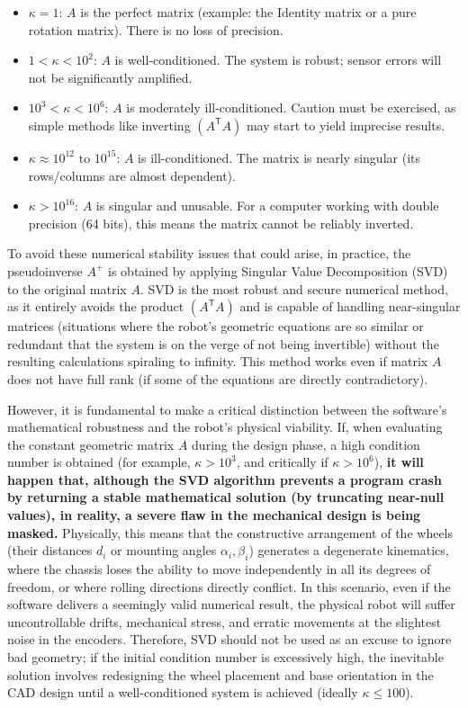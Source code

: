 \documentclass[11pt,a4paper]{article}
\newcommand{\trans}{\mathsf{T}}      %
\begin{document}
\begin{itemize}
    \item \(\kappa = 1\): \(A\) is the perfect matrix (example: the Identity matrix or a pure rotation matrix). There is no loss of precision.
    \item \(1 < \kappa < 10^2\): \(A\) is well-conditioned. The system is robust; sensor errors will not be significantly amplified.
    \item \(10^3 < \kappa < 10^6\): \(A\) is moderately ill-conditioned. Caution must be exercised, as simple methods like inverting \((A^{\trans}A)\) may start to yield imprecise results.
    \item \(\kappa \approx 10^{12} \text{ to } 10^{15}\): \(A\) is ill-conditioned. The matrix is nearly singular (its rows/columns are almost dependent).
    \item \(\kappa > 10^{16}\): \(A\) is singular and unusable. For a computer working with double precision (64 bits), this means the matrix cannot be reliably inverted.
\end{itemize}

To avoid these numerical stability issues that could arise, in practice, the pseudoinverse \(A^+\) is obtained by applying Singular Value Decomposition (SVD) to the original matrix \(A\). SVD is the most robust and secure numerical method, as it entirely avoids the product \((A^{\trans}A)\) and is capable of handling near-singular matrices (situations where the robot's geometric equations are so similar or redundant that the system is on the verge of not being invertible) without the resulting calculations spiraling to infinity. This method works even if matrix \(A\) does not have full rank (if some of the equations are directly contradictory).

However, it is fundamental to make a critical distinction between the software's mathematical robustness and the robot's physical viability. If, when evaluating the constant geometric matrix \(A\) during the design phase, a high condition number is obtained (for example, \(\kappa > 10^3\), and critically if \(\kappa > 10^6\)), \textbf{it will happen that, although the SVD algorithm prevents a program crash by returning a stable mathematical solution (by truncating near-null values), in reality, a severe flaw in the mechanical design is being masked.} Physically, this means that the constructive arrangement of the wheels (their distances \(d_i\) or mounting angles \(\alpha_i, \beta_i\)) generates a degenerate kinematics, where the chassis loses the ability to move independently in all its degrees of freedom, or where rolling directions directly conflict. In this scenario, even if the software delivers a seemingly valid numerical result, the physical robot will suffer uncontrollable drifts, mechanical stress, and erratic movements at the slightest noise in the encoders. Therefore, SVD should not be used as an excuse to ignore bad geometry; if the initial condition number is excessively high, the inevitable solution involves redesigning the wheel placement and base orientation in the CAD design until a well-conditioned system is achieved (ideally \(\kappa \le 100\)).
\end{document}
